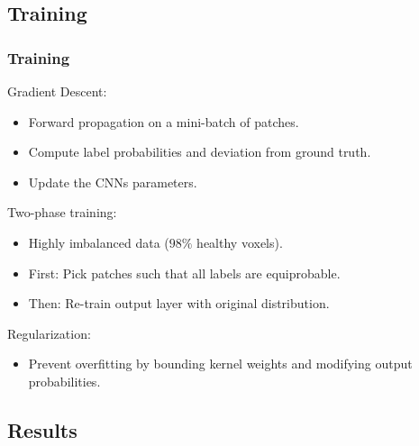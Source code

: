 \documentclass[aspectratio=43, notes]{beamer} 	%
\begin{document}
\subsection{Training}

\begin{frame}
	\frametitle<presentation>{Training}
	\begin{block}{Gradient Descent:}
		\begin{itemize}
			\item Forward propagation on a mini-batch of patches.
			\item Compute label probabilities and deviation from ground truth.
			\item Update the CNNs parameters.
		\end{itemize}
	\end{block}
	\begin{block}{Two-phase training:}
		\begin{itemize}
			\item Highly imbalanced data ($98 \%$ healthy voxels).
			\item First: Pick patches such that all labels are equiprobable.
			\item Then: Re-train output layer with original distribution.
		\end{itemize} 	
 	\end{block}
 	\begin{block}{Regularization:}
		\begin{itemize}
			\item Prevent overfitting by bounding kernel weights and modifying output probabilities.
		\end{itemize} 	
 	\end{block}
\end{frame}

\subsection{Results}
\end{document}
